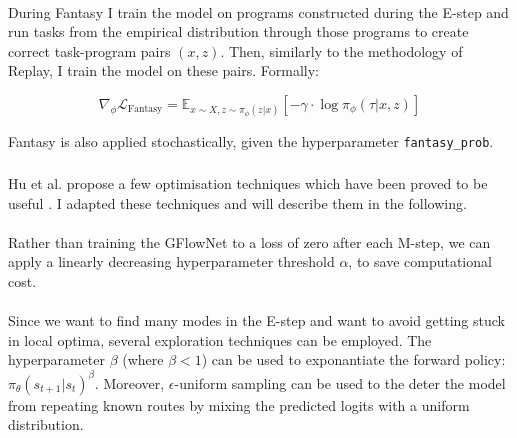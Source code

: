 \paragraph{}
During Fantasy I train the model on programs constructed during the E-step and run tasks from the empirical distribution through those programs to create correct task-program pairs $(x, z)$. Then, similarly to the methodology of Replay, I train the model on these pairs. Formally:

\begin{equation}
    \nabla_\phi\mathcal{L}_{\text{Fantasy}} = \mathbb{E}_{x \sim X, z \sim \pi_\phi(z|x)} \left[ - \gamma \cdot \log \pi_\phi(\tau \vert x, z) \right]
\end{equation}

Fantasy is also applied stochastically, given the hyperparameter \texttt{fantasy\_prob}.

\subsubsection{}\label{sec:optim}
Hu et al. propose a few optimisation techniques which have been proved to be useful \cite{hu_gflownet-em_2023}. I adapted these techniques and will describe them in the following.

\paragraph{}
Rather than training the GFlowNet to a loss of zero after each M-step, we can apply a linearly decreasing hyperparameter threshold $\alpha$, to save computational cost.

\paragraph{}
Since we want to find many modes in the E-step and want to avoid getting stuck in local optima, several exploration techniques can be employed.
The hyperparameter $\beta$ (where $\beta < 1$) can be used to exponantiate the forward policy: $ \pi_\theta(s_{t+1}|s_t)^\beta $.
Moreover, $\epsilon$-uniform sampling can be used to the deter the model from repeating known routes by mixing the predicted logits with a uniform distribution.



